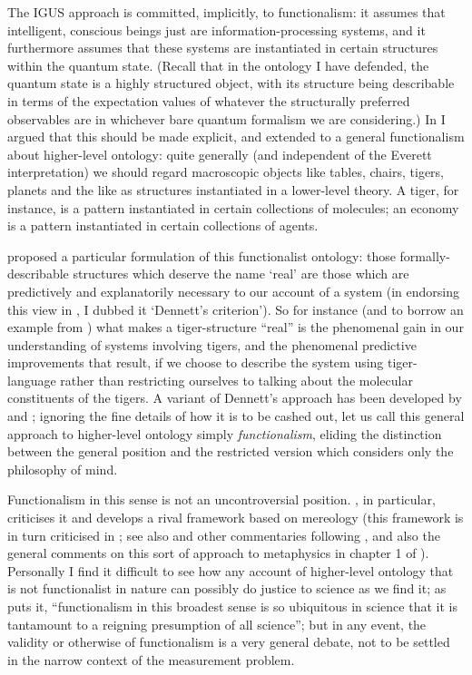 \documentclass[12pt]{article}
\begin{document}
The IGUS approach is committed, implicitly, to functionalism: it assumes that intelligent, conscious beings just are information-processing systems, and it furthermore assumes that these systems are instantiated in certain structures within the quantum state. (Recall that in the ontology I have defended, the quantum state is a highly structured object, with its structure being describable in terms of the expectation values of whatever the structurally preferred observables are in whichever bare quantum formalism we are considering.) In  I argued that this should be made explicit, and extended to a general functionalism about higher-level ontology: quite generally (and independent of the Everett interpretation) we should regard macroscopic objects like tables, chairs, tigers, planets and the like as structures instantiated in a lower-level theory. A tiger, for instance, is a pattern instantiated in certain collections of molecules; an economy is a pattern instantiated in certain collections of agents. 

 proposed a particular formulation of this functionalist ontology: those formally-describable structures which deserve the name `real' are those which are predictively and explanatorily necessary to our account of a system (in endorsing this view in , I dubbed it `Dennett's criterion'). So for instance (and to borrow an example from ) what makes a tiger-structure ``real'' is the phenomenal gain in our understanding of systems involving tigers, and the phenomenal predictive improvements that result, if we choose to describe the system using tiger-language rather than restricting ourselves to talking about the molecular constituents of the tigers. A variant of Dennett's approach has been developed by  and ; ignoring the fine details of how it is to be cashed out, let us call this general approach to higher-level ontology simply \emph{functionalism}, eliding the distinction between the general position and the restricted version which considers only the philosophy of mind.

Functionalism in this sense is not an uncontroversial position. , in particular, criticises it and develops a rival framework based on mereology (this framework is in turn criticised in ; see also   and other commentaries following , and also the general comments on this sort of approach to metaphysics in chapter 1 of ). Personally I find it difficult to see how any account of higher-level ontology that is not functionalist in nature can possibly do justice to science as we find it; as  puts it, ``functionalism in this broadest sense is so ubiquitous in science that it is tantamount to a reigning presumption of all science''; but in any event, the validity or otherwise of functionalism is a very general debate, not to be settled in the narrow context of the measurement problem.
\end{document}
